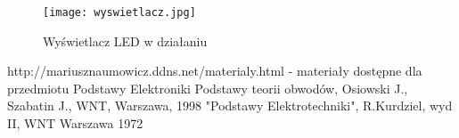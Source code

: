 \documentclass[polish,a4paper]{article}
\begin{document}
\begin{figure}[H]
\centering
\texttt{[image: wyswietlacz.jpg]}
\caption{Wyświetlacz LED w działaniu}
\end{figure}

\newpage


\begin{thebibliography}{3}
 http://mariusznaumowicz.ddns.net/materialy.html - materiały dostępne dla przedmiotu Podstawy Elektroniki
Podstawy teorii obwodów, Osiowski J., Szabatin J., WNT, Warszawa, 1998
"Podstawy Elektrotechniki", R.Kurdziel, wyd II, WNT Warszawa 1972
\end{thebibliography}

\newpage
\tableofcontents{}
\end{document}
